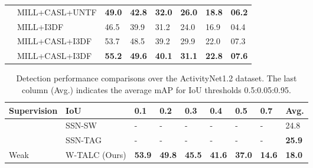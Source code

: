 \documentclass[runningheads]{llncs}
\begin{document}
\begin{table}[h!]
\begin{tabular}{C{1.9cm} || p{2.8cm} || C{1cm} C{1cm}  C{1cm}  C{1cm}  C{1cm} C{1cm}}
		\hline
		{} & {MILL+CASL+UNTF} & {\textbf{49.0}} & {\textbf{42.8}} & {\textbf{32.0}} & {\textbf{26.0}} & {\textbf{18.8}} & {\textbf{06.2}} \\
		& {MILL+I3DF} & {46.5} & {39.9} & {31.2} & {24.0} & {16.9} & {04.4}\\		
		& {MILL+CASL+I3DF} & {53.7} & {48.5} & {39.2} & {29.9} & {22.0} & {07.3} \\
		& {MILL+CASL+I3DF} & {\textbf{55.2}} & {\textbf{49.6}} & {\textbf{40.1}} & {\textbf{31.1}} & {\textbf{22.8}} & {\textbf{07.6}} \\
		\hline
		\hline
	\end{tabular}
	\label{thumos14_localization}
\end{table}
\begin{table}[h!]
	\fontsize{8.5}{9.5}\selectfont
	\centering	
	\caption{Detection performance comparisons over the ActivityNet1.2 dataset. The last column (Avg.) indicates the average mAP for IoU thresholds 0.5:0.05:0.95. }
	\begin{tabular}{C{1.6cm} || p{2.4cm} || C{1cm} C{1cm}  C{1cm}  C{1cm}  C{1cm} C{1cm} C{1cm}}
		\hline
		{Supervision} & {IoU } & {0.1} & {0.2} & {0.3} & {0.4} & {0.5} & {0.7} & {Avg.}\\
		\hline \hline	 
		{} & {SSN-SW \cite{zhao2017temporal}} & {-} & {-} & {-} & {-} & {-} & {-} & {24.8}\\
		& {SSN-TAG \cite{zhao2017temporal}} & {-} & {-} & {-} & {-} & {-} & {-} & {\textbf{25.9}}\\	
		\hline
		\hline
		{Weak} & {W-TALC (Ours)} & {\textbf{53.9}} & {\textbf{49.8}} & {\textbf{45.5}} & {\textbf{41.6}} & {\textbf{37.0}} & {\textbf{14.6}} & {\textbf{18.0}}\\
		\hline
		\hline
	\end{tabular}
	\label{activitynet_localization}
\end{table}
\end{document}

